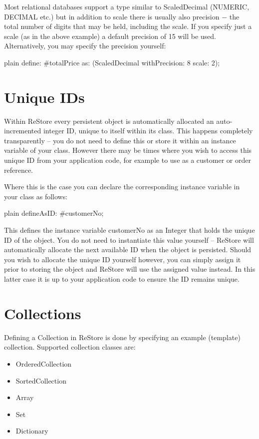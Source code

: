 \documentclass[10pt,twoside,english]{_support/latex/sbabook/sbabook}
\begin{document}
Most relational databases support a type similar to ScaledDecimal (NUMERIC, DECIMAL etc.) but in addition to scale there is usually also precision − the total number of digits that may be held, including the scale. If you specify just a scale (as in the above example) a default precision of 15 will be used. Alternatively, you may specify the precision yourself: 

\begin{displaycode}{plain}
	define: #totalPrice as: (ScaledDecimal withPrecision: 8 scale: 2);
\end{displaycode}
\section{Unique IDs}
Within ReStore every persistent object is automatically allocated an auto-incremented integer ID, unique to itself within its class. This happens completely transparently – you do not need to define this or store it within an instance variable of your class. However there may be times where you wish to access this unique ID from your application code, for example to use as a customer or order reference.

Where this is the case you can declare the corresponding instance variable in your class as follows:

\begin{displaycode}{plain}
	defineAsID: #customerNo;
\end{displaycode}

This defines the instance variable customerNo as an Integer that holds the unique ID of the object. You do not need to instantiate this value yourself – ReStore will automatically allocate the next available ID when the object is persisted. Should you wish to allocate the unique ID yourself however, you can simply assign it prior to storing the object and ReStore will use the assigned value instead. In this latter case it is up to your application code to ensure the ID remains unique.
\section{Collections}
Defining a Collection in ReStore is done by specifying an example (template) collection. Supported collection classes are:

\begin{itemize}
\item OrderedCollection
\item SortedCollection
\item Array
\item Set
\item Dictionary 
\end{itemize}
\end{document}
